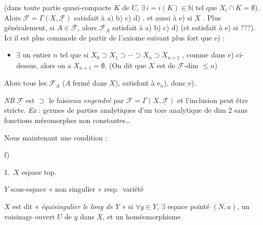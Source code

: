 \documentclass[11pt,a4paper]{article}
\begin{document}
(dans  toute partie quasi-compacte $K$ de $U$, $\exists\, i =
i(K) \in \mathbb{N}$ tel que $X_i \cap K = \emptyset$). Alors $\mathcal{F} =
\Gamma(X, \underline{\mathcal{F}})$ satisfait à a) b) c) d) , et
aussi à e) si $X$ . Plus généralement, si $A \in
\overline{\mathcal{F}}$, alors $\mathcal{F}_A$ satisfait à a) b) c) d)
 (et satisfait à e) si ???).
Ici il est plus commode de partir de l'axiome suivant plus fort que e) :
\begin{itemize}
  \item[e$_n$)] $\exists$ un entier $n$ tel que si $X_0 \supset X_1 \supset
  \cdots \supset X_n \supset X_{n+1}$ , comme dans
  e) ci-dessus, alors on a $X_{n+1} = \emptyset$. (On dit que $X$ est de
  $\underline{\mathcal{F}}$-dim $\leq n$)
\end{itemize}
Alors tous les $\mathcal{F}_A$ ($A$  fermé dans $X$),
satisfont à e$_n$), donc e).

\emph{NB} $\underline{\mathcal{F}}$ est $\supset$  le
faisceau \emph{engendré} par $\mathcal{F} = \Gamma(X,
\underline{\mathcal{F}})$ et l'inclusion peut être stricte. \emph{Ex} :
germes de parties analytiques d'un tore analytique de dim 2 sans fonctions
méromorphes non constantes\ldots{}

Nous   maintenant une condition :

f)

1.\ $X$ espace top.

$Y$ sous-espace « non singulier » resp.\ variété

$X$ est dit « \emph{équisingulier le long de $Y$} » si $\forall y \in Y$,
\struck{\ill{}} $\exists$ espace pointé $(N, a)$,  un voisinage
ouvert $U$ de $y$ dans $X$, et un homéomorphisme

\end{document}
